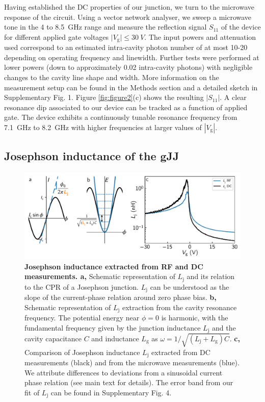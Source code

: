 Having established the DC properties of our junction, we turn to the microwave response of the circuit.
Using a vector network analyser, we sweep a microwave tone in the 4 to \SI{8.5}{GHz} range and measure the reflection signal $S_{11}$ of the device for different applied gate voltages $\lvert V_\text{g} \rvert \leq \SI{30}{V}$.
The input powers and attenuation used correspond to an estimated intra-cavity photon number of at most 10-20 depending on operating frequency and linewidth.
Further tests were performed at lower powers (down to approximately 0.02 intra-cavity photons) with negligible changes to the cavity line shape and width.
More information on the measurement setup can be found in the Methods section and a detailed sketch in Supplementary Fig. 1.
Figure \ref{fig:figure2}(c) shows the resulting $\lvert S_{11}\rvert$.
A clear resonance dip associated to our device can be tracked as a function of applied gate.
The device exhibits a continuously tunable resonance frequency from \SI{7.1}{GHz} to \SI{8.2}{GHz} with higher frequencies at larger values of $|V_\text{g}|$.

\subsection{Josephson inductance of the gJJ}

\begin{figure}[thb]
	\centering
	\includegraphics[width=\linewidth]{chapter-gJJ/figs/fig3_final}
	\caption[]{\textbf{Josephson inductance extracted from RF and DC measurements. a,}
		Schematic representation of $L_\text{j}$ and its relation to the CPR of a Josephson junction.
		$L_\text{j}$ can be understood as the slope of the current-phase relation around zero phase bias.
		\textbf{b,} Schematic representation of $L_\text{j}$ extraction from the cavity resonance frequency.
		The potential energy near $\phi = 0$ is harmonic, with the fundamental frequency given by the junction inductance $L_\text{j}$ and the cavity capacitance $C$ and inductance $L_\text{g}$ as $\omega = 1/\sqrt{(L_\text{j}+L_\text{g})C}$.
		\textbf{c,} Comparison of Josephson inductance $L_\text{j}$ extracted from DC measurements (black) and from the microwave measurements (blue).
		We attribute differences to deviations from a sinusoidal current phase relation (see main text for details).
		The error band from our fit of $L_\text{j}$ can be found in Supplementary Fig. 4.
	}
	\label{fig:figure3}
\end{figure}

